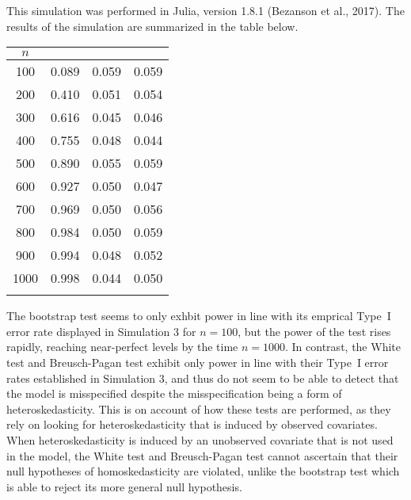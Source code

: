 		This simulation was performed in Julia, version 1.8.1 (Bezanson et al., 2017). The results of the simulation are summarized in the table below.

		\begin{table}[H]
			\centering
			\small\addtolength{\tabcolsep}{-3pt}
			\setlength\extrarowheight{-3pt}
			{
			\begin{tabular}{ c|c|c|c}
			$n$ & \vtop{\hbox{\strut Bootstrap}\hbox{\strut Test}} & \vtop{\hbox{\strut White}\hbox{\strut Test}} & \vtop{\hbox{\strut Breusch-Pagan} \hbox{\strut Test}} \\
			 \hline
			 100 & 0.089 & 0.059 & 0.059 \\
			 200 & 0.410 & 0.051 & 0.054 \\
			 300 & 0.616 & 0.045 & 0.046 \\
			 400 & 0.755 & 0.048 & 0.044 \\
			 500 & 0.890 & 0.055 & 0.059 \\
			 600 & 0.927 & 0.050 & 0.047 \\
			 700 & 0.969 & 0.050 & 0.056 \\
			 800 & 0.984 & 0.050 & 0.059 \\
			 900 & 0.994 & 0.048 & 0.052 \\
			 1000 & 0.998 & 0.044 & 0.050 \\
			 
			 \Xhline{3\arrayrulewidth}
			\end{tabular}
			}
		\end{table}

		The bootstrap test seems to only exhbit power in line with its emprical Type~I error rate displayed in Simulation 3 for $n = 100$, but the power of the test rises
		rapidly, reaching near-perfect levels by the time $n = 1000$. In contrast, the White test and Breusch-Pagan test exhibit only power in line with their Type~I error
		rates established in Simulation 3, and thus do not seem to be able to detect that the model is misspecified despite the misspecification being a form of
		heteroskedasticity. This is on account of how these tests are performed, as they rely on looking for heteroskedasticity that is induced by observed covariates.
		When heteroskedasticity is induced by an unobserved covariate that is not used in the model, the White test and Breusch-Pagan test cannot ascertain that their
		null hypotheses of homoskedasticity are violated, unlike the bootstrap test which is able to reject its more general null hypothesis.


